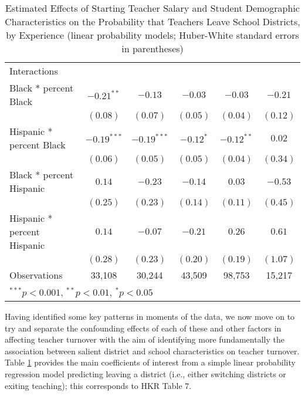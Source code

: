 \begin{table}
\begin{center}
\begin{adjustbox}{width=\textwidth,totalheight=0.85\textheight,keepaspectratio}
\begin{tabular}{l c c c c c }
Interactions                                &               &               &               &              &             \\
\quad Black * percent Black                 & $-0.21^{**}$  & $-0.13$       & $-0.03$       & $-0.03$      & $-0.21$     \\
                                            & $(0.08)$      & $(0.07)$      & $(0.05)$      & $(0.04)$     & $(0.12)$    \\
\quad Hispanic * percent Black              & $-0.19^{***}$ & $-0.19^{***}$ & $-0.12^{*}$   & $-0.12^{**}$ & $0.02$      \\
                                            & $(0.06)$      & $(0.05)$      & $(0.05)$      & $(0.04)$     & $(0.34)$    \\
\quad Black * percent Hispanic              & $0.14$        & $-0.23$       & $-0.14$       & $0.03$       & $-0.53$     \\
                                            & $(0.25)$      & $(0.23)$      & $(0.14)$      & $(0.11)$     & $(0.45)$    \\
\quad Hispanic * percent Hispanic           & $0.14$        & $-0.07$       & $-0.21$       & $0.26$       & $0.61$      \\
                                            & $(0.28)$      & $(0.23)$      & $(0.20)$      & $(0.19)$     & $(1.07)$    \\
\hline
Observations                                & 33,108         & 30,244         & 43,509         & 98,753        & 15,217       \\
\hline
\multicolumn{6}{l}{\scriptsize{$^{***}p<0.001$, $^{**}p<0.01$, $^*p<0.05$}}
\end{tabular}
\end{adjustbox}
\caption{\scriptsize{Estimated Effects of Starting Teacher Salary and Student Demographic Characteristics on the Probability that Teachers Leave School Districts, by Experience (linear probability models; Huber-White standard  errors in parentheses)}}
\label{tbl:reg_lpm}
\end{center}
\end{table}

Having identified some key patterns in moments of the data, we now move
on to try and separate the confounding effects of each of these and
other factors in affecting teacher turnover with the aim of identifying
more fundamentally the association between salient district and school
characteristics on teacher turnover. Table \ref{tbl:reg_lpm} provides
the main coefficients of interest from a simple linear probability
regression model predicting leaving a district (i.e., either switching
districts or exiting teaching); this corresponds to HKR Table 7.

